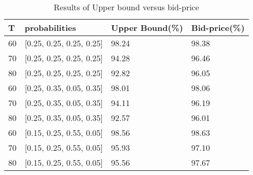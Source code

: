 \begin{table}[ht]
  \centering
  \caption{Results of Upper bound versus bid-price}
  \begin{tabular}{|l|l|l|l|}
  \hline
   T & probabilities & Upper Bound(\%) & Bid-price(\%)  \\
  \hline
   60  & [0.25, 0.25, 0.25, 0.25]  & 98.24 & 98.38  \\
   70  & [0.25, 0.25, 0.25, 0.25]  & 94.28 & 96.46  \\
   80  & [0.25, 0.25, 0.25, 0.25]  & 92.82 & 96.05  \\
   \hline
   60  & [0.25, 0.35, 0.05, 0.35]  & 98.01 & 98.06  \\
   70  & [0.25, 0.35, 0.05, 0.35]  & 94.11 & 96.19  \\
   80  & [0.25, 0.35, 0.05, 0.35]  & 92.57 & 96.01  \\
  \hline
  60  & [0.15, 0.25, 0.55, 0.05]  & 98.56 & 98.63  \\
  70  & [0.15, 0.25, 0.55, 0.05]  & 95.93 & 97.10  \\
  80  & [0.15, 0.25, 0.55, 0.05]  & 95.56 & 97.67  \\
  \hline
  \end{tabular}
\end{table}










